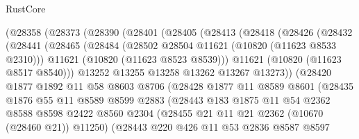 \begin{lexlean}{RustCore}
\begin{coremodule}
              (@28358
                (@28373
                  (@28390
                    (@28401
                      (@28405
                        (@28413
                          (@28418
                            (@28426
                              (@28432
                                (@28441
                                  (@28465
                                    (@28484
                                      (@28502 @28504 @11621 (@10820 (@11623 @8533 @2310)))
                                      @11621
                                      (@10820 (@11623 @8523 @8539)))
                                    @11621
                                    (@10820 (@11623 @8517 @8540)))
                                  @13252
                                  @13255
                                  @13258
                                  @13262
                                  @13267
                                  @13273))
                              (@28420
                                @1877
                                @1892
                                @11
                                @58
                                @8603
                                @8706
                                (@28428
                                  @1877
                                  @11
                                  @8589
                                  @8601
                                  (@28435
                                    @1876
                                    @55
                                    @11
                                    @8589
                                    @8599
                                    @2883
                                    (@28443
                                      @183
                                      @1875
                                      @11
                                      @54
                                      @2362
                                      @8588
                                      @8598
                                      @2422
                                      @8560
                                      @2304
                                      (@28455 @21 @11 @21 @2362 (@10670 (@28460 @21)) @11250)
                                      (@28443
                                        @220
                                        @426
                                        @11
                                        @53
                                        @2836
                                        @8587
                                        @8597

\end{coremodule}
\end{lexlean}
